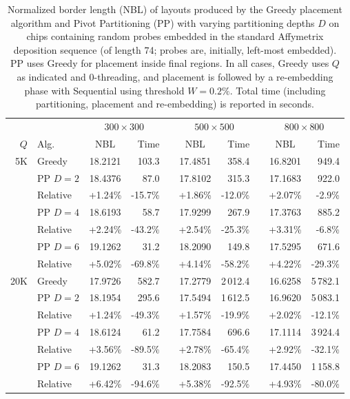 \begin{table}[t!]\centering
\caption{\label{tab:pp_async_bl}
  Normalized border length (NBL) of layouts produced by the Greedy placement
  algorithm and Pivot Partitioning (PP) with varying partitioning depths $D$ on
  chips containing random probes embedded in the standard Affymetrix deposition
  sequence (of length 74; probes are, initially, left-most embedded). PP uses
  Greedy for placement inside final regions. In all cases, Greedy uses $Q$ as
  indicated and $0$-threading, and placement is followed by a re-embedding phase
  with Sequential using threshold $W=0.2\%$. Total time (including partitioning,
  placement and re-embedding) is reported in seconds.}
\footnotesize{
\begin{tabular}{rlcrlcrlcr}
\vspace{1pt}
 & & \multicolumn{2}{c}{$300\times 300$} & & \multicolumn{2}{c}{$500\times 500$} & & \multicolumn{2}{c}{$800\times 800$} \\
\cline{3-4} \cline{6-7} \cline{9-10}
\vspace{1pt}
$Q$ & Alg.     & NBL     & Time    & & NBL     & Time       & & NBL     & Time       \\
\hline
5K  & Greedy   & 18.2121 & 103.3   & & 17.4851 &    358.4   & & 16.8201 &    949.4   \\
\cline{2-10}
    & PP $D=2$ & 18.4376 &  87.0   & & 17.8102 &    315.3   & & 17.1683 &    922.0   \\
    & Relative & +1.24\% & -15.7\% & & +1.86\% &    -12.0\% & & +2.07\% &     -2.9\% \\
\cline{2-10}
    & PP $D=4$ & 18.6193 &  58.7   & & 17.9299 &    267.9   & & 17.3763 &    885.2   \\
    & Relative & +2.24\% & -43.2\% & & +2.54\% &    -25.3\% & & +3.31\% &     -6.8\% \\
\cline{2-10}
    & PP $D=6$ & 19.1262 &  31.2   & & 18.2090 &    149.8   & & 17.5295 &    671.6   \\
    & Relative & +5.02\% & -69.8\% & & +4.14\% &    -58.2\% & & +4.22\% &    -29.3\% \\
\hline
20K & Greedy   & 17.9726 & 582.7   & & 17.2779 & 2\,012.4   & & 16.6258 & 5\,782.1   \\
\cline{2-10}
    & PP $D=2$ & 18.1954 & 295.6   & & 17.5494 & 1\,612.5   & & 16.9620 & 5\,083.1   \\
    & Relative & +1.24\% & -49.3\% & & +1.57\% &    -19.9\% & & +2.02\% &    -12.1\% \\
\cline{2-10}
    & PP $D=4$ & 18.6124 &  61.2   & & 17.7584 &    696.6   & & 17.1114 & 3\,924.4   \\
    & Relative & +3.56\% & -89.5\% & & +2.78\% &    -65.4\% & & +2.92\% &    -32.1\% \\
\cline{2-10}
    & PP $D=6$ & 19.1262 &  31.3   & & 18.2083 &    150.5   & & 17.4450 & 1\,158.8   \\
    & Relative & +6.42\% & -94.6\% & & +5.38\% &    -92.5\% & & +4.93\% &    -80.0\% \\
\hline
\end{tabular}}
\end{table}

